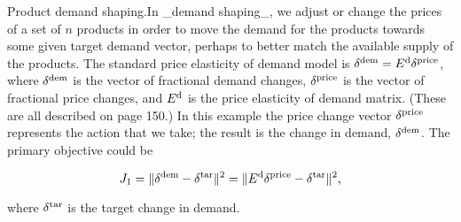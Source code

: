 Product demand shaping.In _demand shaping_, we adjust or change the prices of a set of \(n\) products in order to move the demand for the products towards some given target demand vector, perhaps to better match the available supply of the products. The standard price elasticity of demand model is \(\delta^{\rm dem}=E^{\rm d}\delta^{\rm price}\), where \(\delta^{\rm dem}\) is the vector of fractional demand changes, \(\delta^{\rm price}\) is the vector of fractional price changes, and \(E^{\rm d}\) is the price elasticity of demand matrix. (These are all described on page 150.) In this example the price change vector \(\delta^{\rm price}\) represents the action that we take; the result is the change in demand, \(\delta^{\rm dem}\). The primary objective could be

\[J_{1}=\|\delta^{\rm dem}-\delta^{\rm tar}\|^{2}=\|E^{\rm d}\delta^{\rm price}- \delta^{\rm tar}\|^{2},\]

where \(\delta^{\rm tar}\) is the target change in demand.

 